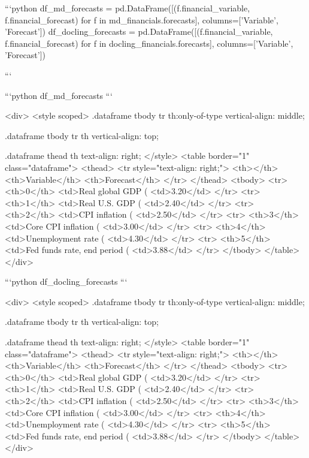 ```python
df_md_forecasts = pd.DataFrame([(f.financial_variable, f.financial_forecast) for f in md_financials.forecasts], 
                      columns=['Variable', 'Forecast'])
df_docling_forecasts = pd.DataFrame([(f.financial_variable, f.financial_forecast) for f in docling_financials.forecasts], 
                      columns=['Variable', 'Forecast'])

```


```python
df_md_forecasts
```




<div>
<style scoped>
    .dataframe tbody tr th:only-of-type {
        vertical-align: middle;
    }

    .dataframe tbody tr th {
        vertical-align: top;
    }

    .dataframe thead th {
        text-align: right;
    }
</style>
<table border="1" class="dataframe">
  <thead>
    <tr style="text-align: right;">
      <th></th>
      <th>Variable</th>
      <th>Forecast</th>
    </tr>
  </thead>
  <tbody>
    <tr>
      <th>0</th>
      <td>Real global GDP (%
      <td>3.20</td>
    </tr>
    <tr>
      <th>1</th>
      <td>Real U.S. GDP (%
      <td>2.40</td>
    </tr>
    <tr>
      <th>2</th>
      <td>CPI inflation (%
      <td>2.50</td>
    </tr>
    <tr>
      <th>3</th>
      <td>Core CPI inflation (%
      <td>3.00</td>
    </tr>
    <tr>
      <th>4</th>
      <td>Unemployment rate (%
      <td>4.30</td>
    </tr>
    <tr>
      <th>5</th>
      <td>Fed funds rate, end period (%
      <td>3.88</td>
    </tr>
  </tbody>
</table>
</div>




```python
df_docling_forecasts
```




<div>
<style scoped>
    .dataframe tbody tr th:only-of-type {
        vertical-align: middle;
    }

    .dataframe tbody tr th {
        vertical-align: top;
    }

    .dataframe thead th {
        text-align: right;
    }
</style>
<table border="1" class="dataframe">
  <thead>
    <tr style="text-align: right;">
      <th></th>
      <th>Variable</th>
      <th>Forecast</th>
    </tr>
  </thead>
  <tbody>
    <tr>
      <th>0</th>
      <td>Real global GDP (%
      <td>3.20</td>
    </tr>
    <tr>
      <th>1</th>
      <td>Real U.S. GDP (%
      <td>2.40</td>
    </tr>
    <tr>
      <th>2</th>
      <td>CPI inflation (%
      <td>2.50</td>
    </tr>
    <tr>
      <th>3</th>
      <td>Core CPI inflation (%
      <td>3.00</td>
    </tr>
    <tr>
      <th>4</th>
      <td>Unemployment rate (%
      <td>4.30</td>
    </tr>
    <tr>
      <th>5</th>
      <td>Fed funds rate, end period (%
      <td>3.88</td>
    </tr>
  </tbody>
</table>
</div>



